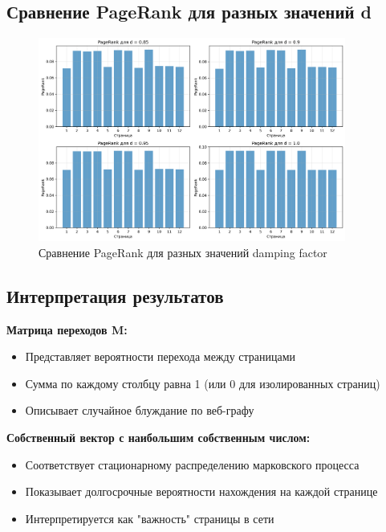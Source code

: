 \subsection*{Сравнение PageRank для разных значений d}

\begin{figure}[H]
    \centering
    \includegraphics[width=0.9\textwidth]{images/task2/pagerank_comparison.png}
    \caption{Сравнение PageRank для разных значений damping factor}
\end{figure}

\subsection*{Интерпретация результатов}

\textbf{Матрица переходов M:}
\begin{itemize}
    \item Представляет вероятности перехода между страницами
    \item Сумма по каждому столбцу равна 1 (или 0 для изолированных страниц)
    \item Описывает случайное блуждание по веб-графу
\end{itemize}

\textbf{Собственный вектор с наибольшим собственным числом:}
\begin{itemize}
    \item Соответствует стационарному распределению марковского процесса
    \item Показывает долгосрочные вероятности нахождения на каждой странице
    \item Интерпретируется как "важность" страницы в сети
\end{itemize}

